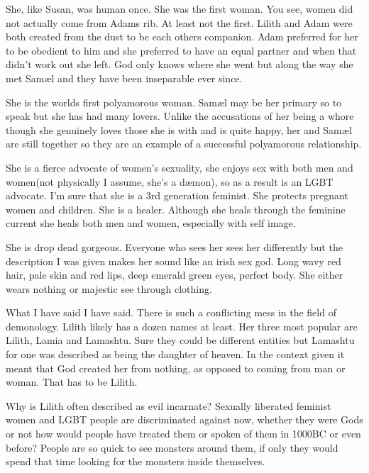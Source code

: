 \documentclass[12pt,twoside,onecolumn,openright,extrafontsizes]{memoir}
\newcommand*\NewPage{\newpage\thispagestyle{empty}\mbox{}}
\newlength\drop
\begin{document}
{She, like Susan, was human once. She was the first woman. You see, women did not actually come from Adams rib. At least not the first. Lilith and Adam were both created from the dust to be each others companion. Adam preferred for her to be obedient to him and she preferred to have an equal partner and when that didn't work out she left. God only knows where she went but along the way she met Sam\ae l and they have been inseparable ever since.

She is the worlds first polyamorous woman. Sam\ae l may be her primary so to speak but she has had many lovers. Unlike the accusations of her being a whore though she genuinely loves those she is with and is quite happy, her and Sam\ae l are still together so they are an example of a successful polyamorous relationship.

She is a fierce advocate of women's sexuality, she enjoys sex with both men and women(not physically I assume, she's a d\ae mon), so as a result is an LGBT advocate. I'm sure that she is a 3rd generation feminist. She protects pregnant women and children. She is a healer. Although she heals through the feminine current she heals both men and women, especially with self image.

She is drop dead gorgeous. Everyone who sees her sees her differently but the description I was given makes her sound like an irish sex god. Long wavy red hair, pale skin and red lips, deep emerald green eyes, perfect body. She either wears nothing or majestic see through clothing.

What I have said I have said. There is such a conflicting mess in the field of demonology. Lilith likely has a dozen names at least. Her three most popular are Lilith, Lamia and Lamashtu. Sure they could be different entities but Lamashtu for one was described as being the daughter of heaven. In the context given it meant that God created her from nothing, as opposed to coming from man or woman. That has to be Lilith. 

Why is Lilith often described as evil incarnate? Sexually liberated feminist women and LGBT people are discriminated against now, whether they were Gods or not how would people have treated them or spoken of them in 1000BC or even before? People are so quick to see monsters around them, if only they would spend that time looking for the monsters inside themselves.
}
\end{document}
